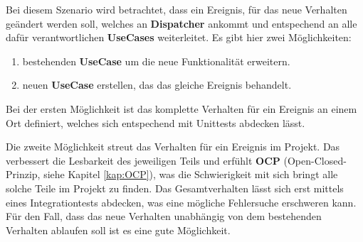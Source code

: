
    Bei diesem Szenario wird betrachtet, dass ein Ereignis, für das neue Verhalten geändert werden soll, welches an \textbf{Dispatcher} ankommt und entspechend an alle dafür 
    verantwortlichen \textbf{UseCases} weiterleitet. 
    Es gibt hier zwei Möglichkeiten:
    \begin{enumerate}
        \item bestehenden \textbf{UseCase} um die neue Funktionalität erweitern.
        \item neuen \textbf{UseCase}  erstellen, das das gleiche Ereignis behandelt.
    \end{enumerate}

    Bei der ersten Möglichkeit ist das komplette Verhalten für ein Ereignis an einem Ort definiert, welches sich entspechend mit Unittests abdecken lässt.

    Die zweite Möglichkeit streut das Verhalten für ein Ereignis im Projekt. 
    Das verbessert die Lesbarkeit des jeweiligen Teils und erfühlt \textbf{OCP} (Open-Closed-Prinzip, siehe Kapitel \ref{kap:OCP}),
    was die Schwierigkeit mit sich bringt alle solche Teile im Projekt zu finden. Das Gesamtverhalten lässt sich erst mittels
    eines Integrationtests abdecken, was eine mögliche Fehlersuche erschweren kann. 
    Für den Fall, dass das neue Verhalten unabhängig von dem bestehenden Verhalten ablaufen soll ist es eine gute Möglichkeit.